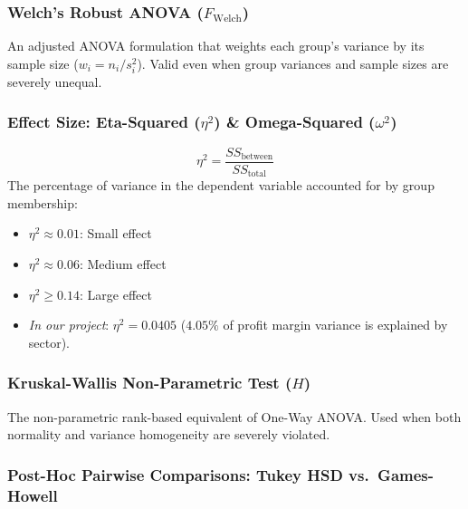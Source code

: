 \documentclass[
]{article}
\providecommand{\tightlist}{%
  \setlength{\itemsep}{0pt}\setlength{\parskip}{0pt}}
\begin{document}
\subsubsection{\texorpdfstring{Welch's Robust ANOVA
(\(F_{\text{Welch}}\))}{Welch's Robust ANOVA (F\_\{\textbackslash text\{Welch\}\})}}\label{welchs-robust-anova-f_textwelch}

An adjusted ANOVA formulation that weights each group's variance by its
sample size (\(w_i = n_i / s_i^2\)). Valid even when group variances and
sample sizes are severely unequal.

\subsubsection{\texorpdfstring{Effect Size: Eta-Squared (\(\eta^2\)) \&
Omega-Squared
(\(\omega^2\))}{Effect Size: Eta-Squared (\textbackslash eta\^{}2) \& Omega-Squared (\textbackslash omega\^{}2)}}\label{effect-size-eta-squared-eta2-omega-squared-omega2}

\[\eta^2 = \frac{SS_{\text{between}}}{SS_{\text{total}}}\] The
percentage of variance in the dependent variable accounted for by group
membership:

\begin{itemize}
\tightlist
\item
  \(\eta^2 \approx 0.01\): Small effect
\item
  \(\eta^2 \approx 0.06\): Medium effect
\item
  \(\eta^2 \ge 0.14\): Large effect
\item
  \emph{In our project}: \(\eta^2 = 0.0405\) (\(4.05\%\) of profit
  margin variance is explained by sector).
\end{itemize}

\subsubsection{\texorpdfstring{Kruskal-Wallis Non-Parametric Test
(\(H\))}{Kruskal-Wallis Non-Parametric Test (H)}}\label{kruskal-wallis-non-parametric-test-h}

The non-parametric rank-based equivalent of One-Way ANOVA. Used when
both normality and variance homogeneity are severely violated.

\subsubsection{Post-Hoc Pairwise Comparisons: Tukey HSD
vs.~Games-Howell}\label{post-hoc-pairwise-comparisons-tukey-hsd-vs.-games-howell}
\end{document}
